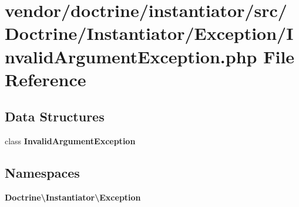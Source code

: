 \section{vendor/doctrine/instantiator/src/\+Doctrine/\+Instantiator/\+Exception/\+Invalid\+Argument\+Exception.php File Reference}
\label{doctrine_2instantiator_2src_2_doctrine_2_instantiator_2_exception_2_invalid_argument_exception_8php}
\subsection*{Data Structures}
\begin{DoxyCompactItemize}
\item 
class {\bf Invalid\+Argument\+Exception}
\end{DoxyCompactItemize}
\subsection*{Namespaces}
\begin{DoxyCompactItemize}
\item 
 {\bf Doctrine\textbackslash{}\+Instantiator\textbackslash{}\+Exception}
\end{DoxyCompactItemize}
